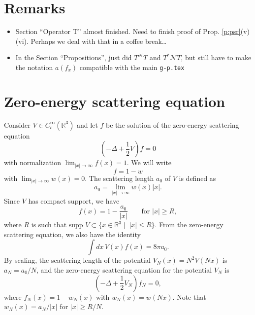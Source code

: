 \documentclass[a4paper,11pt]{article}
\newcommand{\R}{\mathds{R}}
\newcommand{\N}{\mathcal{N}}
\begin{document}
\tableofcontents


\section{Remarks}


\begin{itemize}
  \item Section ``Operator T'' almost finished. Need to finish proof of Prop.
    \ref{p:psr}(v)(vi). Perhaps we deal with that in a coffee break\dots
  \item In the Section ``Propositions'', just did $T^ \N T$ and $T^* \N T$,
    but still have to make the notation $a(f_x)$ compatible with the main {\tt g-p.tex}
\end{itemize}

\section{Zero-energy scattering equation}


Consider $V \in C_c^\infty(\R^3)$ and let $f$ be the solution of the
zero-energy scattering equation
\begin{displaymath}
  \left( -\Delta + \frac{1}{2} V \right) f = 0
\end{displaymath}
with normalization $\lim_{|x|\to\infty} f(x) = 1$. We will write
\begin{displaymath}
  f = 1 - w
\end{displaymath}
with $\lim_{|x|\to\infty} w(x) = 0$. The scattering length $a_0$ of $V$ is
defined as
\begin{displaymath}
  a_0 = \lim_{|x| \to \infty} w(x)|x|.
\end{displaymath}
Since $V$ has compact support, we have
\begin{displaymath}
  f(x) = 1 - \frac{a_0}{|x|} \qquad \text{for } |x| \ge R,
\end{displaymath}
where $R$ is such that $\text{supp }V \subset \{ x \in \R^3 \; | \;\; |x| \le
R \}$. From the zero-energy scattering equation, we also have the identity
\begin{displaymath}
  \int dx \, V(x) f(x) = 8 \pi a_0.
\end{displaymath}
By scaling, the scattering length of the potential $V_N(x) = N^2 V(Nx)$ is
$a_N = a_0/N$, and the zero-energy scattering equation for the potential
$V_N$ is
\begin{displaymath}
  \left( -\Delta + \frac{1}{2} V_N \right) f_N = 0,
\end{displaymath}
where $f_N(x) = 1 - w_N(x)$ with $w_N(x) = w(Nx)$. Note that $w_N(x) =
a_N/|x|$ for $|x| \ge R/N$.
\end{document}
